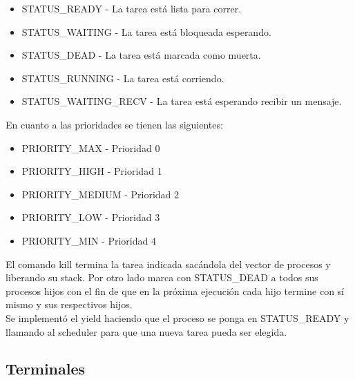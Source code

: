 \documentclass[a4paper,10pt]{article}
\begin{document}
\begin{itemize}
 \item STATUS\_READY - La tarea está lista para correr.
 \item STATUS\_WAITING - La tarea está bloqueada esperando.
 \item STATUS\_DEAD - La tarea está marcada como muerta.
 \item STATUS\_RUNNING - La tarea está corriendo.
 \item STATUS\_WAITING\_RECV - La tarea está esperando recibir un mensaje.
\end{itemize}


En cuanto a las prioridades se tienen las siguientes:

\begin{itemize}
 \item PRIORITY\_MAX - Prioridad 0
 \item PRIORITY\_HIGH - Prioridad 1
 \item PRIORITY\_MEDIUM - Prioridad 2
 \item PRIORITY\_LOW - Prioridad 3
 \item PRIORITY\_MIN - Prioridad 4
\end{itemize}


 

El comando kill termina la tarea indicada sacándola del vector de procesos y 
liberando su stack. Por otro lado marca con STATUS\_DEAD a todos sus procesos hijos 
con el fin de que en la próxima ejecución cada hijo termine con sí mismo y sus
respectivos hijos. \\

Se implementó el yield haciendo que el proceso se ponga en STATUS\_READY y llamando 
al scheduler para que una nueva tarea pueda ser elegida.

\subsection{Terminales}
\end{document}
